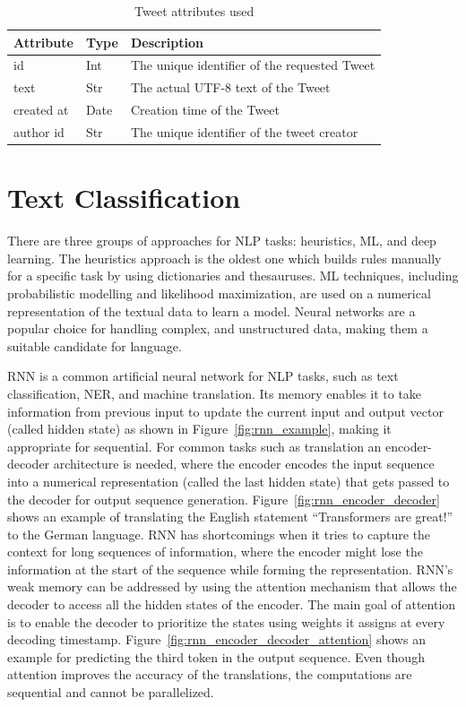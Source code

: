 \begin{table}
  \center
  \label{tab:tweet_attr}
  \begin{tabular}{|l|l|l|}
    \hline
    Attribute & Type & Description \\
    \hline
    id & Int & The unique identifier of the requested Tweet \\
    \hline
    text & Str & The actual UTF-8 text of the Tweet \\
    \hline
    created at & Date  & Creation time of the Tweet \\
    \hline
    author id & Str & The unique identifier of the tweet creator \\
    \hline
  \end{tabular}
  \caption{Tweet attributes used}
\end{table}

\section{Text Classification}

There are three groups of approaches for \ac{NLP} tasks: heuristics, \ac{ML}, and deep
learning. The heuristics approach is the oldest one which builds rules manually for a specific task
by using dictionaries and thesauruses. \ac{ML} techniques, including probabilistic
modelling and likelihood maximization, are used on a numerical representation of the textual data to
learn a model. Neural networks are a popular choice for handling complex, and unstructured data,
making them a suitable candidate for language.

\ac{RNN} \cite{hopfieldNeuralNetworksPhysical1982} is a common artificial neural network for
\ac{NLP} tasks, such as text classification, \ac{NER}, and machine translation. Its memory enables
it to take information from previous input to update the current input and output vector (called
hidden state) as shown in Figure~\ref{fig:rnn_example}, making it appropriate for sequential. For common
tasks such as translation  an encoder-decoder architecture is needed, where the encoder encodes the
input sequence into a numerical representation (called the last hidden state) that gets passed to
the decoder for output sequence generation. Figure~\ref{fig:rnn_encoder_decoder} shows an example of translating the
English statement ``Transformers are great!'' to the German language. \ac{RNN} has shortcomings when it tries to
capture the context for long sequences of information, where the encoder might lose the information
at the start of the sequence while forming the representation. \ac{RNN}'s  weak memory can be
addressed by using the attention mechanism that allows the decoder to access all the hidden states
of the encoder. The main goal of attention is to enable the decoder to prioritize the states using
weights it assigns at every decoding timestamp. Figure~\ref{fig:rnn_encoder_decoder_attention} shows
an example for predicting the third token in the output sequence. Even though attention improves the
accuracy of the translations, the computations are sequential and cannot be parallelized.

